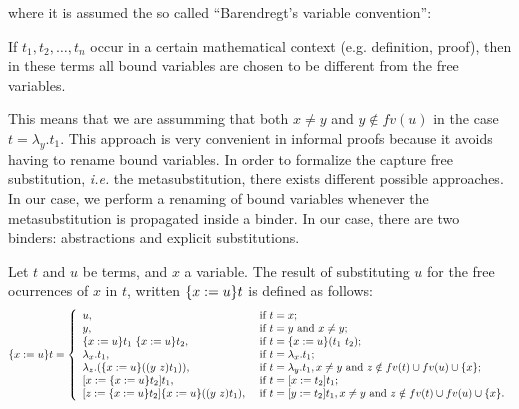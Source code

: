 \noindent where it is assumed the so called ``Barendregt's variable convention'':


\begin{tcolorbox}
 If $t_1, t_2, \ldots, t_n$ occur in a certain mathematical context (e.g. definition, proof), then in these terms all bound variables are chosen to be different from the free variables.  
\end{tcolorbox}


This means that we are assumming that both $x \neq y$ and $y\notin fv(u)$ in the case $t = \lambda_y.t_1$. This approach is very convenient in informal proofs because it avoids having to rename bound variables. In order to formalize the capture free substitution, {\it i.e.} the metasubstitution, there exists different possible approaches. In our case, we perform a renaming of bound variables whenever the metasubstitution is propagated inside a binder. In our case, there are two binders: abstractions and explicit substitutions.


Let $t$ and $u$ be terms, and $x$ a variable. The result of substituting $u$ for the free ocurrences of $x$ in $t$, written $\metasub{t}{x}{u}$ is defined as follows:\newline
\begin{equation}\label{msubst}
\metasub{t}{x}{u} = \left\{
 \begin{array}{ll}
  u, & \mbox{ if } t = x; \\
  y, & \mbox{ if } t = y \mbox{ and } x \neq y; \\
  \metasub{t_1}{x}{u}\ \metasub{t_2}{x}{u}, & \mbox{ if } t = \metasub{(t_1\ t_2)}{x}{u}; \\
  \lambda_x.t_1, & \mbox{ if } t = \lambda_x.t_1; \\
  \lambda_z.(\metasub{(\swap{y}{z}{t_1})}{x}{u}), & \mbox{ if } t = \lambda_y.t_1, x \neq y \mbox{ and } z\notin fv(t)\cup fv(u) \cup \{x\}; \\
  \esub{t_1}{x}{\metasub{t_2}{x}{u}}, & \mbox{ if } t = \esub{t_1}{x}{t_2}; \\
  \esub{\metasub{(\swap{y}{z}{t_1})}{x}{u}}{z}{\metasub{t_2}{x}{u}}, & \mbox{ if } t = \esub{t_1}{y}{t_2}, x \neq y \mbox{ and } z\notin fv(t)\cup fv(u) \cup \{x\}.
 \end{array}\right.
\end{equation}


